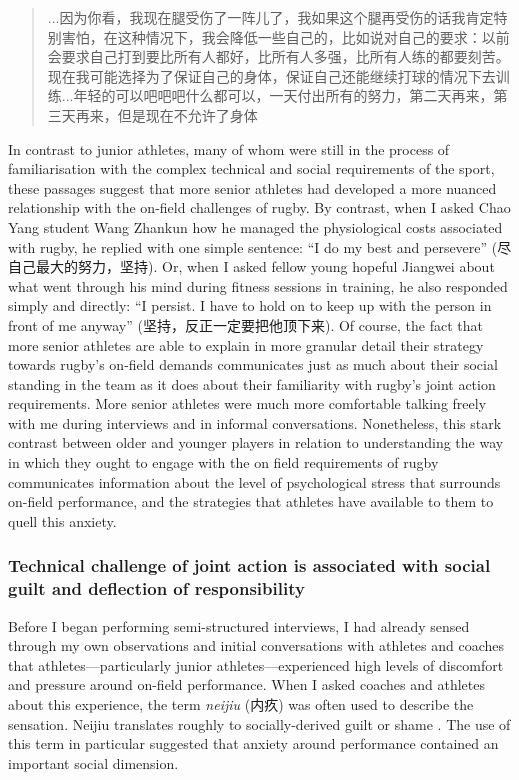 \begin{CJK}{UTF8}{gbsn}
\begin{quote}
      ...因为你看，我现在腿受伤了一阵儿了，我如果这个腿再受伤的话我肯定特别害怕，在这种情况下，我会降低一些自己的，比如说对自己的要求：以前会要求自己打到要比所有人都好，比所有人多强，比所有人练的都要刻苦。现在我可能选择为了保证自己的身体，保证自己还能继续打球的情况下去训练...年轻的可以吧吧吧什么都可以，一天付出所有的努力，第二天再来，第三天再来，但是现在不允许了身体
\end{quote}

In contrast to junior athletes, many of whom were still in the process of familiarisation with the complex technical and social requirements of the sport, these passages suggest that more senior athletes had developed a more nuanced relationship with the on-field challenges of rugby.  By contrast, when I asked Chao Yang student Wang Zhankun how he managed the physiological costs associated with rugby, he replied with one simple sentence: ``I do my best and persevere'' (尽自己最大的努力，坚持).  Or, when I asked fellow young hopeful Jiangwei about what went through his mind during fitness sessions in training, he also responded simply and directly: ``I persist. I have to hold on to keep up with the person in front of me anyway'' (坚持，反正一定要把他顶下来).  Of course, the fact that more senior athletes are able to explain in more granular detail their strategy towards rugby's on-field demands communicates just as much about their social standing in the team as it does about their familiarity with rugby's joint action requirements.  More senior athletes were much more comfortable talking freely with me during interviews and in informal conversations.  Nonetheless, this stark contrast between older and younger players in relation to understanding the way in which they ought to engage with the on field requirements of rugby communicates information about the level of psychological stress that surrounds on-field performance, and the strategies that athletes have available to them to quell this anxiety.







\subsubsection{Technical challenge of joint action is associated with social guilt and deflection of responsibility}

Before I began performing semi-structured interviews, I had already sensed through my own observations and initial conversations with athletes and coaches that athletes---particularly junior athletes---experienced high levels of discomfort and pressure around on-field performance. When I asked coaches and athletes about this experience, the term \textit{neijiu} (内疚) was often used to describe the sensation.  Neijiu translates roughly to socially-derived guilt or shame \citep{Pleco2018}.  The use of this term in particular suggested that anxiety around performance contained an important social dimension.


\end{CJK}
